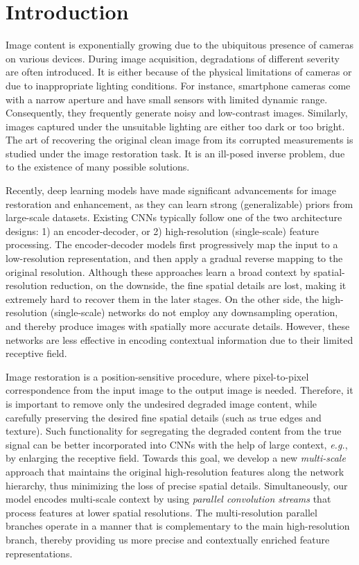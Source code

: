 \documentclass[runningheads]{llncs}
\begin{document}
\section{Introduction}
Image content is exponentially growing due to the ubiquitous presence of cameras on various devices.  
During image acquisition, degradations of different severity are often introduced.
It is either because of the physical limitations of cameras or due to inappropriate lighting conditions.
For instance, smartphone cameras come with a narrow aperture and have small sensors with limited dynamic range. 
Consequently, they frequently generate noisy and low-contrast images. 
Similarly, images captured under the unsuitable lighting are either too dark or too bright.
The art of recovering the original clean image from its corrupted measurements is studied under the image restoration task. It is an ill-posed inverse problem, due to the existence of many possible solutions. 



Recently, deep learning models have made significant advancements for image restoration and enhancement, as they can learn strong (generalizable) priors from large-scale datasets. 
Existing CNNs typically follow one of the two architecture designs: 1) an encoder-decoder, or 2) high-resolution (single-scale) feature processing. 
The encoder-decoder models \cite{ronneberger2015u,kupyn2019deblurgan,chen2018,zhang2019kindling} first progressively map the input to a low-resolution representation, and then apply a gradual reverse mapping to the original resolution. Although these approaches learn a broad context by spatial-resolution reduction, on the downside, the fine spatial details are lost, making it extremely hard to recover them in the later stages. On the other side, the high-resolution (single-scale) networks \cite{dong2015image,DnCNN,zhang2020residual,ignatov2017dslr} do not employ any downsampling operation, and thereby produce images with spatially more accurate details. However, these networks are less effective in encoding contextual information due to their limited receptive field.


Image restoration is a position-sensitive procedure, where pixel-to-pixel correspondence from the input image to the output image is needed. Therefore, it is important to remove only the undesired degraded image content, while carefully preserving the desired fine spatial details (such as true edges and texture).
Such functionality for segregating the degraded content from the true signal can be better incorporated into CNNs with the help of large context, \textit{e.g.}, by enlarging the receptive field. 
Towards this goal, we develop a new \emph{multi-scale} approach that maintains the original high-resolution features along the network hierarchy, thus minimizing the loss of precise spatial details. Simultaneously, our model encodes multi-scale context by using \emph{parallel convolution streams} that process features at lower spatial resolutions. 
The multi-resolution parallel branches operate in a manner that is complementary to the main high-resolution branch, thereby providing us more precise and contextually enriched feature representations. 
\end{document}
